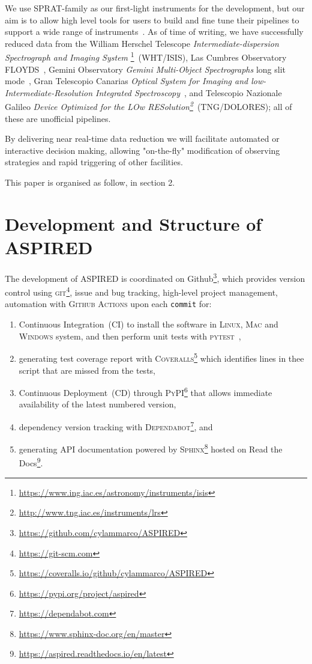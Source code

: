 \documentclass[fleqn,usenatbib]{mnras}
\begin{document}
We use SPRAT-family as our first-light instruments for the development, but our aim is to
allow high level tools for users to build and fine tune their pipelines to support
a wide range of instruments~\citep{2020arXiv201203505L, marco_2021_4463569}. As of time of
writing, we have successfully reduced data from the William Herschel Telescope
\textit{Intermediate-dispersion Spectrograph and Imaging System}
\footnote{\url{https://www.ing.iac.es/astronomy/instruments/isis}}~(WHT/ISIS), Las Cumbres
Observatory FLOYDS~\citep[LCO/FLOYDS]{2013PASP..125.1031B}, Gemini Observatory
\textit{Gemini Multi-Object Spectrographs} long slit
mode~\citep[Gemini/GMOS-LS]{2004PASP..116..425H}, Gran Telescopio Canarias \textit{Optical
System for Imaging and low-Intermediate-Resolution Integrated
Spectroscopy}~\citep[GTC/OSIRIS]{2000SPIE.4008..623C}, and Telescopio Nazionale Galileo
\textit{Device Optimized for the LOw
RESolution\footnote{\url{http://www.tng.iac.es/instruments/lrs}}}~(TNG/DOLORES); all of
these are unofficial pipelines.

By delivering near real-time data reduction we will facilitate automated or interactive
decision making, allowing "on-the-fly" modification of observing strategies and rapid
triggering of other facilities.

This paper is organised as follow, in section 2.

\section{Development and Structure of ASPIRED}
The development of ASPIRED is coordinated on Github\footnote{\url{https://github.com/cylammarco/ASPIRED}}, which provides version control using \textsc{git}\footnote{\url{https://git-scm.com}}, issue and bug tracking, high-level project management, automation with \textsc{Github Actions} upon each \texttt{commit} for:

\begin{enumerate}
    \item Continuous Integration~(CI) to install the software in \textsc{Linux}, \textsc{Mac} and \textsc{Windows} system, and then perform unit tests with \textsc{pytest}~\citep{pytest6.2},
    \item generating test coverage report with \textsc{Coveralls}\footnote{\url{https://coveralls.io/github/cylammarco/ASPIRED}} which identifies lines in thee script that are missed from the tests,
    \item Continuous Deployment~(CD) through \textsc{PyPI}\footnote{\url{https://pypi.org/project/aspired}} that allows immediate availability of the latest numbered version,
    \item dependency version tracking with \textsc{Dependabot}\footnote{\url{https://dependabot.com}}, and
    \item generating API documentation powered by \textsc{Sphinx}\footnote{\url{https://www.sphinx-doc.org/en/master}} hosted on Read the Docs\footnote{\url{https://aspired.readthedocs.io/en/latest}}.
\end{enumerate}
\end{document}

